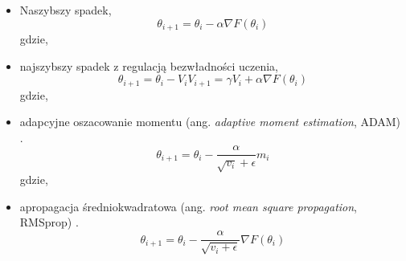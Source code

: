 \begin{itemize}
\item Naszybszy spadek,
\begin{equation}
\theta_{i+1} = \theta_i - \alpha \nabla F(\theta_i)
\end{equation}
gdzie,
\item najszybszy spadek z regulacją bezwładności uczenia,
\begin{equation}
\theta_{i+1} = \theta_i - V_i
V_{i+1} = \gamma V_i + \alpha \nabla F(\theta_i)
\end{equation}
gdzie,
\item adapcyjne oszacowanie momentu (ang. \textit{adaptive moment estimation}, ADAM) \cite{Kingma2014AdamAM}.
\begin{equation}
\theta_{i+1} = \theta_i - \frac{\alpha}{\sqrt{v_i} + \epsilon} m_i
\end{equation}
gdzie,
\item apropagacja średniokwadratowa (ang. \textit{root mean square propagation}, RMSprop) \cite{Kurbiel2017TrainingOD}.
\begin{equation}
\theta_{i+1} = \theta_i - \frac{\alpha}{\sqrt{v_i + \epsilon}} \nabla F(\theta_i)
\end{equation}
\end{itemize}

